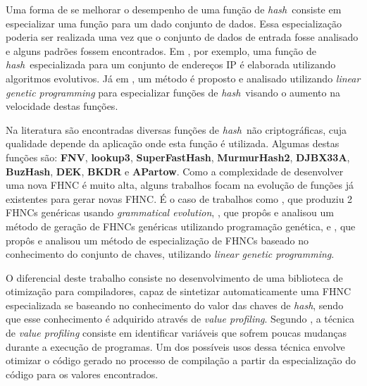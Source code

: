 \documentclass[12pt]{article}
\newcommand{\hash}{\textit{hash}}
\begin{document}
Uma forma de se melhorar o desempenho de uma função de \hash\ consiste em especializar uma função para um dado conjunto de dados. Essa especialização poderia ser realizada uma vez que o conjunto de dados de entrada fosse analisado e alguns padrões fossem encontrados. Em \cite{dobai2017evolutionary}, por exemplo, uma função de \hash\ especializada para um conjunto de endereços IP é elaborada utilizando algoritmos evolutivos. Já em \cite{grochol2016evolutionary}, um método é proposto e analisado utilizando \textit{linear genetic programming} para especializar funções de \hash\ visando o aumento na velocidade destas funções.

Na literatura são encontradas diversas funções de \hash\ não criptográficas, cuja qualidade depende da aplicação onde esta função é utilizada. Algumas destas funções são: \textbf{FNV}, \textbf{lookup3}, \textbf{SuperFastHash}, \textbf{MurmurHash2}, \textbf{DJBX33A}, \textbf{BuzHash}, \textbf{DEK}, \textbf{BKDR} e \textbf{APartow}. Como a complexidade de desenvolver uma nova FHNC é muito alta, alguns trabalhos focam na evolução de funções já existentes para gerar novas FHNC. É o caso de trabalhos como \cite{berarducci2004gevosh}, que produziu 2 FHNCs genéricas usando \textit{grammatical evolution}, \cite{estebanez2014automatic}, que propôs e analisou um método de geração de FHNCs genéricas utilizando programação genética, e \cite{saez2019evolutionary}, que propôs e analisou um método de especialização de FHNCs baseado no conhecimento do conjunto de chaves, utilizando \textit{linear genetic programming}.

O diferencial deste trabalho consiste no desenvolvimento de uma biblioteca de otimização para compiladores, capaz de sintetizar automaticamente uma FHNC especializada se baseando no conhecimento do valor das chaves de \hash, sendo que esse conhecimento é adquirido através de \textit{value profiling}.
Segundo \cite{calder1997value}, a técnica de \textit{value profiling} consiste em identificar variáveis que sofrem poucas mudanças durante a execução de programas. Um dos possíveis usos dessa técnica envolve otimizar o código gerado no processo de compilação a partir da especialização do código para os valores encontrados.
\end{document}
